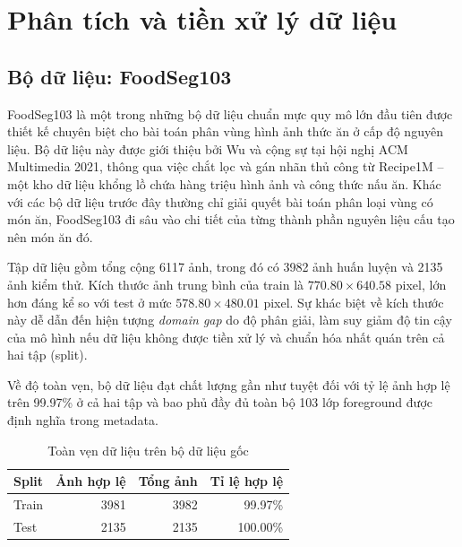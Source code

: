 \section{Phân tích và tiền xử lý dữ liệu}

\subsection{Bộ dữ liệu: FoodSeg103}

FoodSeg103 là một trong những bộ dữ liệu chuẩn mực quy mô lớn đầu tiên được thiết kế chuyên biệt cho bài toán phân vùng hình ảnh thức ăn ở cấp độ nguyên liệu. Bộ dữ liệu này được giới thiệu bởi Wu và cộng sự tại hội nghị ACM Multimedia 2021, thông qua việc chắt lọc và gán nhãn thủ công từ Recipe1M – một kho dữ liệu khổng lồ chứa hàng triệu hình ảnh và công thức nấu ăn. Khác với các bộ dữ liệu trước đây thường chỉ giải quyết bài toán phân loại vùng có món ăn, FoodSeg103 đi sâu vào chi tiết của từng thành phần nguyên liệu cấu tạo nên món ăn đó.

Tập dữ liệu gồm tổng cộng 6117 ảnh, trong đó có 3982 ảnh huấn luyện và 2135 ảnh kiểm thử. Kích thước ảnh trung bình của train là $770.80\times640.58$ pixel, lớn hơn đáng kể so với test ở mức $578.80\times480.01$ pixel. Sự khác biệt về kích thước này dễ dẫn đến hiện tượng \emph{domain gap} do độ phân giải, làm suy giảm độ tin cậy của mô hình nếu dữ liệu không được tiền xử lý và chuẩn hóa nhất quán trên cả hai tập (split).

Về độ toàn vẹn, bộ dữ liệu đạt chất lượng gần như tuyệt đối với tỷ lệ ảnh hợp lệ trên 99.97\% ở cả hai tập và bao phủ đầy đủ toàn bộ 103 lớp foreground được định nghĩa trong metadata.

\begin{table}[H]
    \centering
    \caption{Toàn vẹn dữ liệu trên bộ dữ liệu gốc}
    \begin{tabular}{lrrr}
        \toprule
        Split & Ảnh hợp lệ & Tổng ảnh & Tỉ lệ hợp lệ \\
        \midrule
        Train & 3981 & 3982 & 99.97\% \\
        Test  & 2135 & 2135 & 100.00\% \\
        \bottomrule
    \end{tabular}
\end{table}

